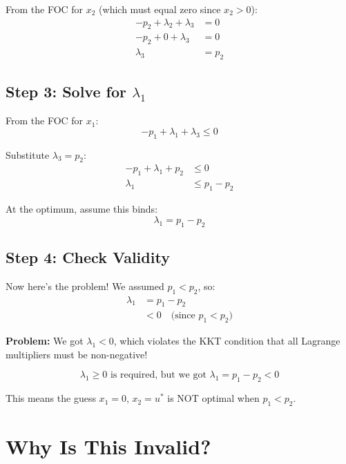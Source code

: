 \documentclass[11pt]{article}
\begin{document}
From the FOC for $x_2$ (which must equal zero since $x_2 > 0$):
\begin{align}
-p_2 + \lambda_2 + \lambda_3 &= 0 \\
-p_2 + 0 + \lambda_3 &= 0 \\
\lambda_3 &= p_2
\end{align}

\subsection{Step 3: Solve for $\lambda_1$}

From the FOC for $x_1$:
\begin{equation}
-p_1 + \lambda_1 + \lambda_3 \leq 0
\end{equation}

Substitute $\lambda_3 = p_2$:
\begin{align}
-p_1 + \lambda_1 + p_2 &\leq 0 \\
\lambda_1 &\leq p_1 - p_2
\end{align}

At the optimum, assume this binds:
\begin{equation}
\lambda_1 = p_1 - p_2
\end{equation}

\subsection{Step 4: Check Validity}

Now here's the problem! We assumed $p_1 < p_2$, so:
\begin{align}
\lambda_1 &= p_1 - p_2 \\
&< 0 \quad \text{(since $p_1 < p_2$)}
\end{align}

\begin{tcolorbox}[colback=red!10!white,colframe=red!75!black,title=INVALID!]
\textbf{Problem:} We got $\lambda_1 < 0$, which violates the KKT condition that all Lagrange multipliers must be non-negative!

$$\lambda_1 \geq 0 \text{ is required, but we got } \lambda_1 = p_1 - p_2 < 0$$

This means the guess $x_1 = 0$, $x_2 = u^*$ is NOT optimal when $p_1 < p_2$.
\end{tcolorbox}

\section{Why Is This Invalid?}
\end{document}
